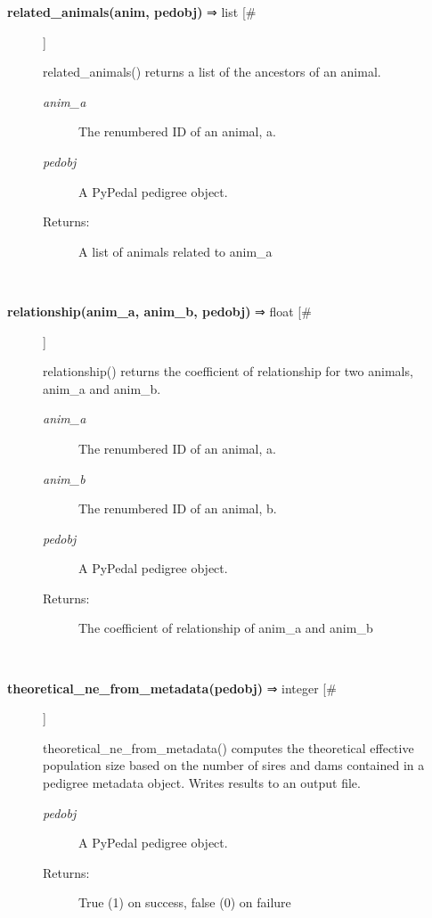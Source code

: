 \begin{description}
\item[\textbf{related\_animals(anim, pedobj)} ⇒ list [\#]
]
\par related\_animals() returns a list of the ancestors of an animal.
\begin{description}
\item[\textit{anim\_a}
]
The renumbered ID of an animal, a.
\item[\textit{pedobj}
]
A PyPedal pedigree object.
\item[Returns:
]
A list of animals related to anim\_a
\end{description}\\

\item[\textbf{relationship(anim\_a, anim\_b, pedobj)} ⇒ float [\#]
]
\par relationship() returns the coefficient of relationship for two
animals, anim\_a and anim\_b.
\begin{description}
\item[\textit{anim\_a}
]
The renumbered ID of an animal, a.
\item[\textit{anim\_b}
]
The renumbered ID of an animal, b.
\item[\textit{pedobj}
]
A PyPedal pedigree object.
\item[Returns:
]
The coefficient of relationship of anim\_a and anim\_b
\end{description}\\

\item[\textbf{theoretical\_ne\_from\_metadata(pedobj)} ⇒ integer [\#]
]
\par theoretical\_ne\_from\_metadata() computes the theoretical effective population
size based on the number of sires and dams contained in a pedigree metadata
object.  Writes results to an output file.
\begin{description}
\item[\textit{pedobj}
]
A PyPedal pedigree object.
\item[Returns:
]
True (1) on success, false (0) on failure
\end{description}\\

\end{description}
